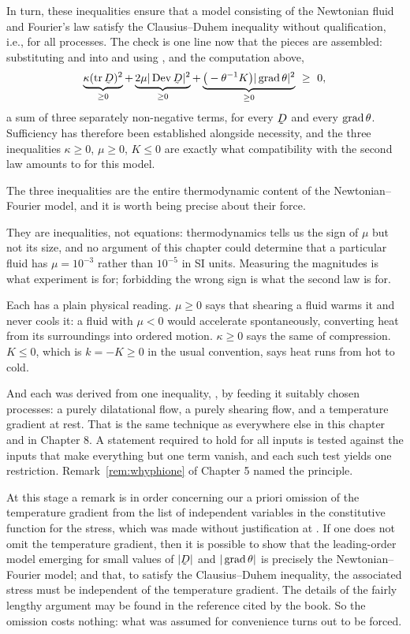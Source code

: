In turn, these inequalities ensure that a model consisting of the
Newtonian fluid and Fourier's law satisfy the Clausius--Duhem inequality
without qualification, i.e., for all processes. The check is one line
now that the pieces are assembled: substituting  and
 into  and using ,  and the
computation above,
\[
   \underbrace{\kappa(\tr\bD)^{2}}_{\geq0}
   +\underbrace{2\mu|\Dev\bD|^{2}}_{\geq0}
   +\underbrace{\big(-\theta^{-1}K\big)|\grad\theta|^{2}}_{\geq0}
   \ \geq\ 0 ,
\]
a sum of three separately non-negative terms, for every $\bD$ and every
$\operatorname{grad}\theta$. Sufficiency has therefore been established alongside
necessity, and the three inequalities $\kappa\geq0$, $\mu\geq0$,
$K\leq0$ are exactly what compatibility with the second law amounts to
for this model.

\begin{remark}
\label{rem:ch9whatCD}
The three inequalities are the entire thermodynamic content of the
Newtonian--Fourier model, and it is worth being precise about their
force.

They are inequalities, not equations: thermodynamics tells us the sign
of $\mu$ but not its size, and no argument of this chapter could
determine that a particular fluid has $\mu=10^{-3}$ rather than
$10^{-5}$ in SI units. Measuring the magnitudes is what experiment is
for; forbidding the wrong sign is what the second law is for.

Each has a plain physical reading. $\mu\geq0$ says that shearing a fluid
warms it and never cools it: a fluid with $\mu<0$ would accelerate
spontaneously, converting heat from its surroundings into ordered
motion. $\kappa\geq0$ says the same of compression. $K\leq0$, which is
$k=-K\geq0$ in the usual convention, says heat runs from hot to cold.

And each was derived from one inequality, , by feeding it
suitably chosen processes: a purely dilatational flow, a purely
shearing flow, and a temperature gradient at rest. That is the same
technique as everywhere else in this chapter and in Chapter 8. A
statement required to hold for all inputs is tested against the
inputs that make everything but one term vanish, and each such test
yields one restriction. Remark~\ref{rem:whyphione} of Chapter 5 named
the principle.
\end{remark}

At this stage a remark is in order concerning our a priori omission of
the temperature gradient from the list of independent variables in the
constitutive function for the stress, which was made without
justification at . If one does not omit the temperature
gradient, then it is possible to show that the leading-order model
emerging for small values of $|\bD|$ and $|\operatorname{grad}\theta|$ is precisely
the Newtonian--Fourier model; and that, to satisfy the Clausius--Duhem
inequality, the associated stress must be independent of the temperature
gradient. The details of the fairly lengthy argument may be found in the
reference cited by the book. So the omission costs nothing: what was
assumed for convenience turns out to be forced.

